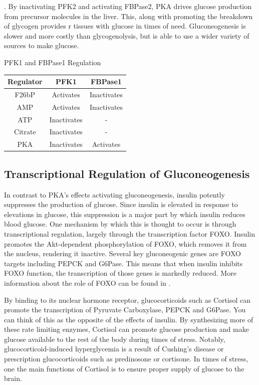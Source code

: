 \documentclass{tufte-handout}
\begin{document}
.  By inactivating PFK2 and activating FBPase2, PKA drives glucose production from precursor molecules in the liver.  This, along with promoting the breakdown of glycogen provides r tissues with glucose in times of need.  Gluconeogenesis is slower and more costly than glycogenolysis, but is able to use a wider variety of sources to make glucose.

\begin{margintable}
\centering
\caption{PFK1 and FBPase1 Regulation}
\label{tab:fbpase-pfk}
\begin{tabular}{ccc}
\hline
\textbf {Regulator} & \textbf{PFK1}  & \textbf{FBPase1} \\
\hline
F26bP & Activates & Inactivates\\
AMP & Activates & Inactivates \\
ATP & Inactivates & - \\
Citrate & Inactivates & - \\
PKA & Inactivates & Activates\\
\hline
\end{tabular}
\end{margintable}

\subsection{Transcriptional Regulation of Gluconeogenesis}

In contrast to PKA's effects activating gluconeogenesis, insulin potently suppresses the production of glucose.  Since insulin is elevated in response to elevations in glucose, this suppression is a major part by which insulin reduces blood glucose.  One mechanism by which this is thought to occur is through transcriptional regulation, largely through the transcription factor FOXO.  Insulin promotes the Akt-dependent phosphorylation of FOXO, which removes it from the nucleus, rendering it inactive.  Several key gluconeogenic genes are FOXO targets including PEPCK and G6Pase.  This means that when insulin inhibits FOXO function, the transcription of those genes is markedly reduced.  More information about the role of FOXO can be found in \citet{Barthel2005}.

  By binding to its nuclear hormone receptor, glucocorticoids such as Cortisol can promote the transcription of Pyruvate Carboxylase, PEPCK and G6Pase.  You can think of this as the opposite of the effects of insulin.  By synthesizing more of these rate limiting enzymes, Cortisol can promote glucose production and make glucose available to the rest of the body during times of stress.  Notably, glucocorticoid-induced hyperglycemia is a result of Cushing's disease or prescription glucocorticoids such as predinosone or cortisone.  In times of stress, one the main functions of Cortisol is to ensure proper supply of glucose to the brain.  
\end{document}
